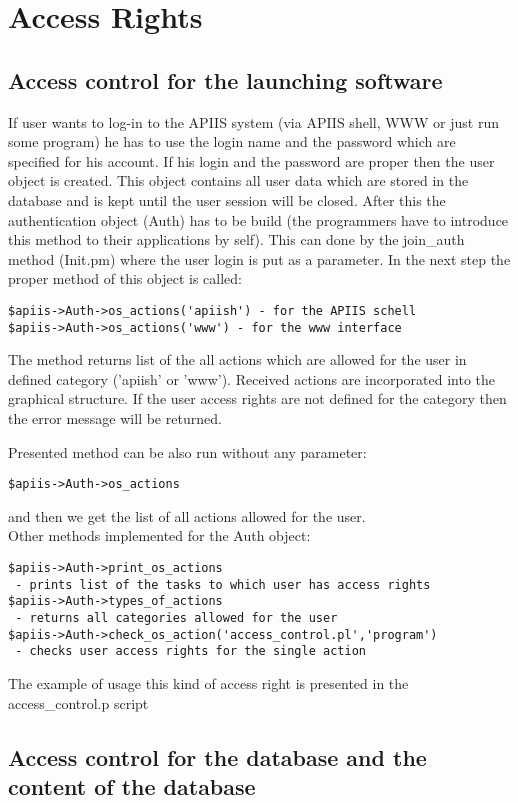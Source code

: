 \chapter{Access Rights}
\section{Access control for the launching software}
If user wants to log-in to the APIIS system (via APIIS shell, WWW or just run some program) he has to use the login name and the password which are specified for his account. If his login and the password are proper then the user object is created. This object contains all user data which are stored in the database and is kept until the user session will be closed. After this the authentication object (Auth) has to be build (the programmers have to introduce this method to their applications by self). This can done by the join\_auth method (Init.pm) where the user login is put as a parameter. In the next step the proper method of this object is called:
\begin{verbatim}
$apiis->Auth->os_actions('apiish') - for the APIIS schell
$apiis->Auth->os_actions('www') - for the www interface
\end{verbatim}
The method returns list of the all actions which are allowed for the user in defined category ('apiish' or 'www'). Received actions are incorporated into the graphical structure. If the user access rights are not defined for the category then the error message will be returned. 

Presented method can be also run without any parameter:
\begin{verbatim}
$apiis->Auth->os_actions
\end{verbatim}
and then we get the list of all actions allowed for the user.\\
Other methods implemented for the Auth object:
\begin{verbatim}
$apiis->Auth->print_os_actions 
 - prints list of the tasks to which user has access rights
$apiis->Auth->types_of_actions 
 - returns all categories allowed for the user
$apiis->Auth->check_os_action('access_control.pl','program') 
 - checks user access rights for the single action
\end{verbatim}

The example of usage this kind of access right is presented in the access\_control.p script 

\section{Access control for the database and the content of the database}


